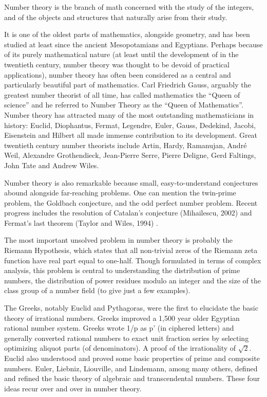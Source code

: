 \documentclass[12pt]{article}
\begin{document}

Number theory is the branch of math concerned with the study of the integers, and of the objects and structures that naturally arise from their study.   

It is one of the oldest parts of mathematics, alongside geometry, and has been studied at least since the ancient Mesopotamians and Egyptians. Perhaps because of its purely mathematical nature (at least until the development of     in the twentieth century, number theory was thought to be devoid of practical applications), number theory has often been considered as a central and particularly beautiful part of mathematics. Carl Friedrich Gauss, arguably the greatest number theorist of all time, has called mathematics the ``Queen of science'' and he referred to Number Theory as the ``Queen of Mathematics''. Number theory has attracted many of the most outstanding mathematicians in history: Euclid, Diophantus, Fermat, Legendre, Euler, Gauss, Dedekind, Jacobi, Eisenstein and Hilbert all made immense contribution to its development. Great twentieth century number theorists include Artin, Hardy, Ramanujan, Andr\'{e} Weil, Alexandre Grothendieck,  Jean-Pierre Serre, Pierre Deligne, Gerd Faltings, John Tate and Andrew Wiles.

Number theory is also remarkable because small, easy-to-understand conjectures abound alongside far-reaching problems. 
One can mention the twin-prime problem, the Goldbach conjecture, and the odd perfect number problem. Recent progress includes the resolution of Catalan's conjecture (Mihailescu, 2002) and Fermat's last theorem (Taylor and Wiles, 1994) .

The most important unsolved problem in number theory is probably the Riemann Hypothesis, which states that all non-trivial zeros of the Riemann zeta function have real part equal to one-half. Though formulated in terms of complex analysis, this problem is central to understanding the distribution of prime numbers, the distribution of power residues modulo an integer and the size of the class group of a number field (to give just a few examples). 

The Greeks, notably Euclid and Pythagoras, were the first to elucidate the basic theory of irrational numbers. Greeks improved a 1,500 year older Egyptian rational number system. Greeks wrote 1/p as p' (in ciphered letters) and generally converted rational numbers to exact unit fraction series by selecting optimizing aliquot parts (of denominators). A proof of the irrationality of $\sqrt{2}$. Euclid also understood and proved some basic properties of prime and composite numbers. Euler, Liebniz, Liouville, and Lindemann, among many others, defined and refined the basic theory of algebraic and transcendental numbers. These four ideas recur over and over in number theory.
\end{document}
